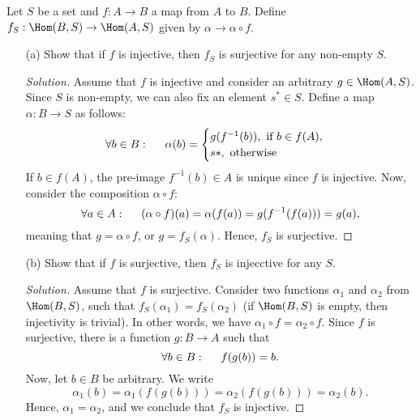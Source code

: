 


    

\begin{problem}
    Let $S$ be a set and $f \colon A \to B$ a map from $A$ to $B$. Define $f_S : \Hom(B, S) \to \Hom(A, S)$ given by $\alpha \to \alpha \circ f$.
    \begin{enumerate}
        \item[(a)]
            Show that if $f$ is injective, then $f_S$ is surjective for any non-empty $S$.
            \begin{proof}[Solution]
                Assume that $f$ is injective and consider an arbitrary $g \in \Hom(A, S)$. Since $S$ is non-empty, we can also fix an element $s^* \in S$. Define a map $\alpha \colon B \to S$ as follows:
                \[
                    \forall b \in B: \hspace{0.5cm} \alpha(b) = \begin{cases}
                        g(f^{-1}(b)), \mbox{ if } b \in f(A),\\
                        s*, \mbox{ otherwise }
                    \end{cases}
                \]
                If $b \in f(A)$, the pre-image $f^{-1}(b) \in A$ is unique since $f$ is injective. Now, consider the composition $\alpha \circ f$:
                \[
                    \forall a \in A: \hspace{0.5cm} (\alpha \circ f)(a) = \alpha(f(a)) = g(f^{-1}(f(a))) = g(a),
                \]
                meaning that $g = \alpha \circ f$, or $g = f_S(\alpha)$. Hence, $f_S$ is surjective.
            \end{proof}

        \item[(b)]
            Show that if $f$ is surjective, then $f_S$ is injecctive for any $S$.
            \begin{proof}[Solution]
                Assume that $f$ is surjective. Consider two functions $\alpha_1$ and $\alpha_2$ from $\Hom(B,S)$, such that $f_S(\alpha_1) = f_S(\alpha_2)$ (if $\Hom(B,S)$ is empty, then injectivity is trivial). In other words, we have $\alpha_1 \circ f = \alpha_2 \circ f$. Since $f$ is surjective, there is a function $g \colon B \to A$ such that
                \[
                    \forall b \in B: \hspace{0.5cm} f(g(b)) = b.
                \]
                Now, let $b \in B$ be arbitrary. We write
                \[
                    \alpha_1(b) = \alpha_1(f(g(b))) = \alpha_2(f(g(b))) = \alpha_2(b).
                \]
                Hence, $\alpha_1 = \alpha_2$, and we conclude that $f_S$ is injective.
            \end{proof}


\end{enumerate}
\end{problem}
